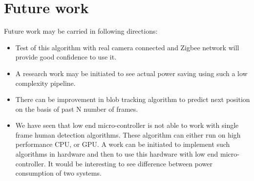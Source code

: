 \section{Future work}
Future work may be carried in following directions:
\begin{itemize}
\item Test of this algorithm with real camera connected and Zigbee
network will provide good confidence to use it.
\item A research work may be initiated to see actual power saving using
such a low complexity pipeline.
\item There can be improvement in blob tracking algorithm to predict
next position on the basis of past N number of frames.
\item We have seen that low end micro-controller is not able to work with
single frame human detection algorithms. These algorithm can either run on
high performance CPU, or GPU. A work can be initiated to implement such
algorithms in hardware and then to use this hardware with low end
micro-controller. It would be interesting to see difference between power
consumption of two systems.
\end{itemize}

